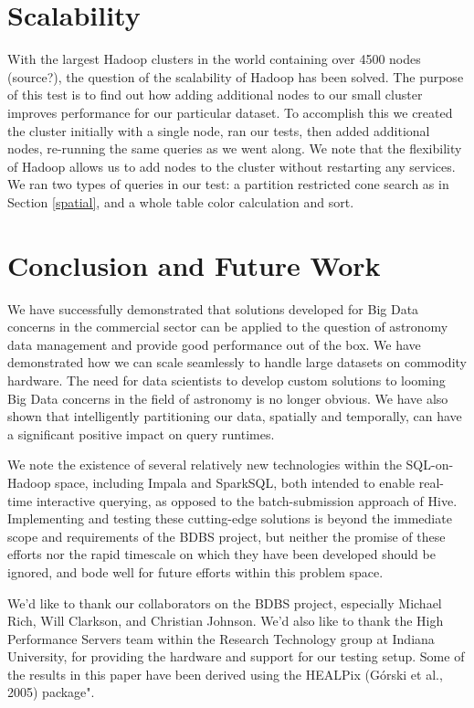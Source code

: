 \documentclass[11pt,twoside]{article}
\begin{document}
\section{Scalability}
With the largest Hadoop clusters in the world containing over 4500 nodes (source?), the question of the scalability of Hadoop has been solved.  The purpose of this test is to find out how adding additional nodes to our small cluster improves performance for our particular dataset.  To accomplish this we created the cluster initially with a single node, ran our tests, then added additional nodes, re-running the same queries as we went along.  We note that the flexibility of Hadoop allows us to add nodes to the cluster without restarting any services.  We ran two types of queries in our test:  a partition restricted cone search as in Section \ref{spatial}, and a whole table color calculation and sort.  


\section{Conclusion and Future Work}

We have successfully demonstrated that solutions developed for Big Data concerns in the commercial sector can be applied to the question of astronomy data management and provide good performance out of the box.  We have demonstrated how we can scale seamlessly to handle large datasets on commodity hardware.  The need for data scientists to develop custom solutions to looming Big Data concerns in the field of astronomy is no longer obvious.  We have also shown that intelligently partitioning our data, spatially and temporally, can have a significant positive impact on query runtimes.  

We note the existence of several relatively new technologies within the SQL-on-Hadoop space, including Impala and SparkSQL, both intended to enable real-time interactive querying, as opposed to the batch-submission approach of Hive.  Implementing and testing these cutting-edge solutions is beyond the immediate scope and requirements of the BDBS project, but neither the promise of these efforts nor the rapid timescale on which they have been developed should be ignored, and bode well for future efforts within this problem space.  

\acknowledgements We'd like to thank our collaborators on the BDBS project, especially Michael Rich, Will Clarkson, and Christian Johnson.  We'd also like to thank the High Performance Servers team within the Research Technology group at Indiana University, for providing the hardware and support for our testing setup. Some of the results in this paper have been derived using the HEALPix (Górski et al., 2005) package".


\end{document}
